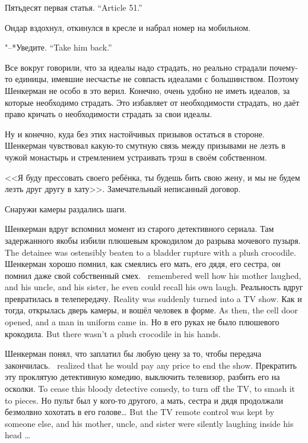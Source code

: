 {Пятьдесят первая статья.}
{``Article 51.''}

Ондар вздохнул, откинулся в кресле и набрал номер на мобильном.

{"--*Уведите.}
{``Take him back.''}

\asterism

\textspace

Все вокруг говорили, что за идеалы надо страдать, но реально страдали почему-то единицы, имевшие несчастье не совпасть идеалами с большинством.
Поэтому Шенкерман не особо в это верил.
Конечно, очень удобно не иметь идеалов, за которые необходимо страдать.
Это избавляет от необходимости страдать, но даёт право кричать о необходимости страдать за свои идеалы.

Ну и конечно, куда без этих настойчивых призывов остаться в стороне.
Шенкерман чувствовал какую-то смутную связь между призывами не лезть в чужой монастырь и стремлением устраивать трэш в своём собственном.

<<Я буду прессовать своего ребёнка, ты будешь бить свою жену, и мы не будем лезть друг другу в хату>>.
Замечательный неписанный договор.

Снаружи камеры раздались шаги.

Шенкерман вдруг вспомнил момент из старого детективного сериала.
{Там задержанного якобы избили плюшевым крокодилом до разрыва мочевого пузыря.}
{The detainee was ostensibly beaten to a bladder rupture with a plush crocodile.}
{Шенкерман хорошо помнил, как смеялись его мать, его дядя, его сестра, он помнил даже свой собственный смех.}
{\Shenkerman\ remembered well how his mother laughed, and his uncle, and his sister, he even could recall his own laugh.}
{Реальность вдруг превратилась в телепередачу.}
{Reality was suddenly turned into a TV show.}
{Как и тогда, открылась дверь камеры, и вошёл человек в форме.}
{As then, the cell door opened, and a man in uniform came in.}
{Но в его руках не было плюшевого крокодила.}
{But there wasn't a plush crocodile in his hands.}

{Шенкерман понял, что заплатил бы любую цену за то, чтобы передача закончилась.}
{\Shenkerman\ realized that he would pay any price to end the show.}
{Прекратить эту проклятую детективную комедию, выключить телевизор, разбить его на осколки.}
{To cease this bloody detective comedy, to turn off the TV, to smash it to pieces.}
{Но пульт был у кого-то другого, а мать, сестра и дядя продолжали безмолвно хохотать в его голове\ldots{}}
{But the TV remote control was kept by someone else, and his mother, uncle, and sister were silently laughing inside his head \ldots{}}

